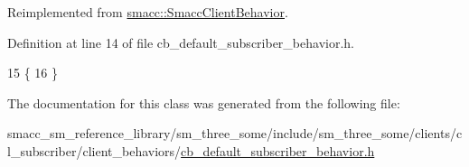 Reimplemented from \hyperlink{classsmacc_1_1SmaccClientBehavior_a7962382f93987c720ad432fef55b123f}{smacc\+::\+Smacc\+Client\+Behavior}.



Definition at line 14 of file cb\+\_\+default\+\_\+subscriber\+\_\+behavior.\+h.


\begin{DoxyCode}
15     \{
16     \}
\end{DoxyCode}


The documentation for this class was generated from the following file\+:\begin{DoxyCompactItemize}
\item 
smacc\+\_\+sm\+\_\+reference\+\_\+library/sm\+\_\+three\+\_\+some/include/sm\+\_\+three\+\_\+some/clients/cl\+\_\+subscriber/client\+\_\+behaviors/\hyperlink{sm__three__some_2include_2sm__three__some_2clients_2cl__subscriber_2client__behaviors_2cb__default__subscriber__behavior_8h}{cb\+\_\+default\+\_\+subscriber\+\_\+behavior.\+h}\end{DoxyCompactItemize}
